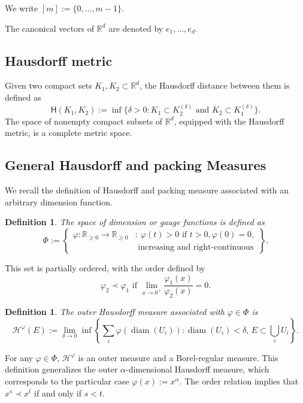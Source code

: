 \documentclass[12pt]{amsart}
\renewcommand{\phi}{\varphi}
\DeclareMathOperator{\diam}{diam}
\newtheorem{definition}[theorem]{Definition}
\def\R{{\mathbb{R}}}
\numberwithin{theorem}{section}
\numberwithin{equation}{section}
\begin{document}
We write $[m]:=\{0,\ldots,m-1\}$.

The canonical vectors of $\R^d$ are denoted by $e_1,\ldots,e_d$.


\subsection{Hausdorff metric}
\label{subsec:Hausdorff-metric}


Given two compact sets $K_1,K_2\subset \R^d$, the Hausdorff distance between them is defined as
\[
    \mathsf{H}(K_1,K_2):=\inf\{\delta>0: K_1\subset K_2^{(\delta)} \text{ and } K_2\subset K_1^{(\delta)} \}.
\]
The space of nonempty compact subsets of $\R^d$, equipped with the Hausdorff metric, is a complete metric space.

\subsection{General Hausdorff and packing Measures}\label{sectionGHPM}
We recall the definition of Hausdorff and packing measure associated with an arbitrary dimension function.
\begin{definition}
    The space of \emph{dimension} or \emph{gauge} functions is defined as
    \begin{equation*}
        \Phi:= \left\{
        \begin{array}{ll}
            \phi:\R_{\geq 0}\to\R_{\geq 0} & \mathrm{ :\ } \phi(t)>0 \text{ if } t>0,
            \phi(0)=0,                                                                            \\
                                        & \mathrm{   } \text{ increasing and right-continuous}
        \end{array}
        \right\}.
    \end{equation*}
\end{definition}
This set is partially ordered, with the order defined by
\[
    \phi_2 \prec \phi_1 \text{ if } \lim_{x \to 0^+} \frac{\phi_1(x)}{\phi_2(x)} =0.
\]



\begin{definition}
    The outer \emph{Hausdorff measure} associated with $\phi\in \Phi$ is
    \[
        \mathcal{H}^\phi(E):=\lim_{\delta\to 0} \inf \left\{ \sum_{i}\phi(\diam(U_i)) : \diam(U_i)<\delta, \, E\subset\bigcup_i U_i  \right\}.
    \]
\end{definition}
For any $\phi \in \Phi$,  $\mathcal{H}^\phi$ is an outer measure and a Borel-regular measure. This definition generalizes the outer $\alpha$-dimensional Hausdorff measure, which corresponds to the particular case $\phi(x):=x^{\alpha}$. The order relation implies that $x^s \prec x^t$ if and only if $s<t$.
\end{document}

